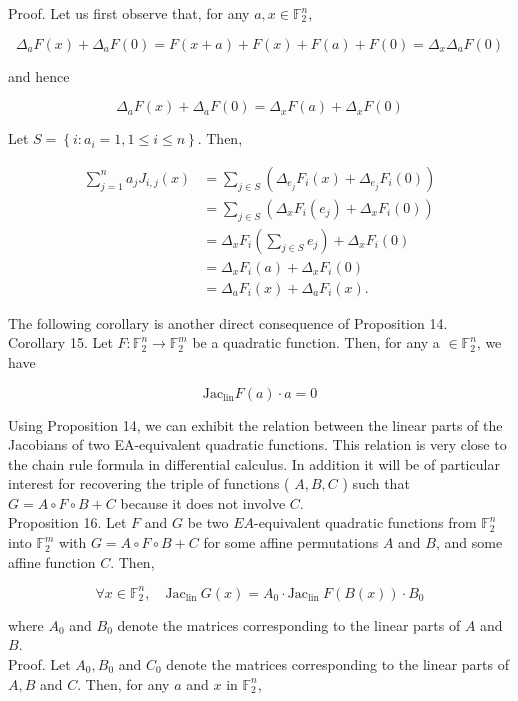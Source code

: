\documentclass[10pt]{article}
\begin{document}
Proof. Let us first observe that, for any $a, x \in \mathbb{F}_{2}^{n}$,

$$
\Delta_{a} F(x)+\Delta_{a} F(0)=F(x+a)+F(x)+F(a)+F(0)=\Delta_{x} \Delta_{a} F(0)
$$

and hence

$$
\Delta_{a} F(x)+\Delta_{a} F(0)=\Delta_{x} F(a)+\Delta_{x} F(0)
$$

Let $S=\left\{i: a_{i}=1,1 \leqslant i \leqslant n\right\}$. Then,

$$
\begin{aligned}
\sum_{j=1}^{n} a_{j} J_{i, j}(x) & =\sum_{j \in S}\left(\Delta_{e_{j}} F_{i}(x)+\Delta_{e_{j}} F_{i}(0)\right) \\
& =\sum_{j \in S}\left(\Delta_{x} F_{i}\left(e_{j}\right)+\Delta_{x} F_{i}(0)\right) \\
& =\Delta_{x} F_{i}\left(\sum_{j \in S} e_{j}\right)+\Delta_{x} F_{i}(0) \\
& =\Delta_{x} F_{i}(a)+\Delta_{x} F_{i}(0) \\
& =\Delta_{a} F_{i}(x)+\Delta_{a} F_{i}(x) .
\end{aligned}
$$

The following corollary is another direct consequence of Proposition 14.\\
Corollary 15. Let $F: \mathbb{F}_{2}^{n} \rightarrow \mathbb{F}_{2}^{m}$ be a quadratic function. Then, for any a $\in \mathbb{F}_{2}^{n}$, we have

$$
\mathrm{Jac}_{\operatorname{lin}} F(a) \cdot a=0
$$

Using Proposition 14, we can exhibit the relation between the linear parts of the Jacobians of two EA-equivalent quadratic functions. This relation is very close to the chain rule formula in differential calculus. In addition it will be of particular interest for recovering the triple of functions ( $A, B, C$ ) such that $G=A \circ F \circ B+C$ because it does not involve $C$.\\
Proposition 16. Let $F$ and $G$ be two $E A$-equivalent quadratic functions from $\mathbb{F}_{2}^{n}$ into $\mathbb{F}_{2}^{m}$ with $G=A \circ F \circ B+C$ for some affine permutations $A$ and $B$, and some affine function $C$. Then,


\begin{equation*}
\forall x \in \mathbb{F}_{2}^{n}, \quad \mathrm{Jac}_{\text {lin }} G(x)=A_{0} \cdot \mathrm{Jac}_{\text {lin }} F(B(x)) \cdot B_{0} \tag{4}
\end{equation*}


where $A_{0}$ and $B_{0}$ denote the matrices corresponding to the linear parts of $A$ and $B$.\\
Proof. Let $A_{0}, B_{0}$ and $C_{0}$ denote the matrices corresponding to the linear parts of $A, B$ and $C$. Then, for any $a$ and $x$ in $\mathbb{F}_{2}^{n}$,
\end{document}
